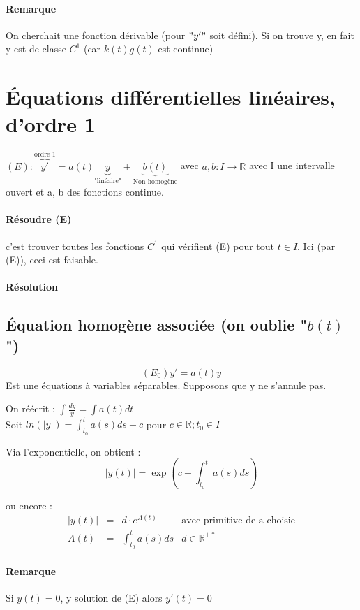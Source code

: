 \paragraph{Remarque} On cherchait une fonction dérivable (pour $"y'"$ soit défini). Si on trouve y, en fait y est de classe $C^1$ (car $k(t)g(t)$ est continue)

\section{Équations différentielles linéaires, d'ordre 1}

$(E) :  \overbrace{y'}^{\text{ordre 1}} = a(t)\underbrace{y}_{\text{"linéaire"}} + \underbrace{b(t)}_{\text{Non homogène}}$ avec $a, b : I \to \mathbb{R}$ avec I une intervalle ouvert  et a, b des fonctions continue.

\paragraph{Résoudre (E)} c'est trouver toutes les fonctions $C^1$ qui vérifient (E) pour tout $t \in I$. Ici (par (E)), ceci est faisable.

\paragraph{Résolution}
\subsection{Équation homogène associée (on oublie "$b(t)$")}

\[(E_0) y' = a(t) y\]
Est une équations à variables séparables. Supposons que y ne s'annule pas.

On réécrit : $\int \frac{dy}{y} = \int a(t) dt$ ~\\
Soit $ln(|y|) = \int_{t_0}^t a(s)ds + c$ pour $c \in \mathbb{R}; t_0 \in I$

Via l'exponentielle, on obtient : \[|y(t)| = \exp(c+\int_{t_0}^t a(s)ds)\]

ou encore : \[\begin{array}{rclr}
|y(t)| &=& d \cdot e^{A(t)} & \text{avec primitive de a choisie}  \\
A(t) &=& \int_{t_0}^t a(s)ds & d \in \mathbb{R}^{+*}
\end{array}\]

\paragraph{Remarque} Si $y(t) = 0$, y solution de (E) alors $y'(t) = 0$

